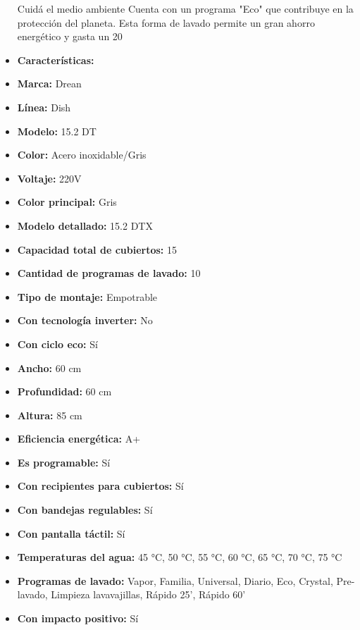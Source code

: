 \documentclass{article}
\begin{document}
\begin{adjustwidth}{2em}{}
\begin{itemize}
Cuidá el medio ambiente
Cuenta con un programa "Eco" que contribuye en la protección del planeta. Esta forma de lavado permite un gran ahorro energético y gasta un 20%
    \item \textbf{Características:}
    \item \textbf {Marca:} Drean
    \item \textbf {Línea:} Dish
    \item \textbf {Modelo:} 15.2 DT
    \item \textbf {Color:} Acero inoxidable/Gris
    \item \textbf {Voltaje:} 220V
    \item \textbf {Color principal:} Gris
    \item \textbf {Modelo detallado:} 15.2 DTX
    \item \textbf {Capacidad total de cubiertos:} 15
    \item \textbf {Cantidad de programas de lavado:} 10
    \item \textbf {Tipo de montaje:} Empotrable
    \item \textbf {Con tecnología inverter:} No
    \item \textbf {Con ciclo eco:} Sí
    \item \textbf {Ancho:} 60 cm
    \item \textbf {Profundidad:} 60 cm
    \item \textbf {Altura:} 85 cm
    \item \textbf {Eficiencia energética:} A+
    \item \textbf {Es programable:} Sí
    \item \textbf {Con recipientes para cubiertos:} Sí
    \item \textbf {Con bandejas regulables:} Sí
    \item \textbf {Con pantalla táctil:} Sí
    \item \textbf {Temperaturas del agua:} 45 °C, 50 °C, 55 °C, 60 °C, 65 °C, 70 °C, 75 °C
    \item \textbf {Programas de lavado:} Vapor, Familia, Universal, Diario, Eco, Crystal, Pre-lavado, Limpieza lavavajillas, Rápido 25', Rápido 60'
    \item \textbf {Con impacto positivo:} Sí
\end{itemize}

\vspace{1\baselineskip} %
\end{adjustwidth}

\setcounter{subsection}{0} %
\end{document}
